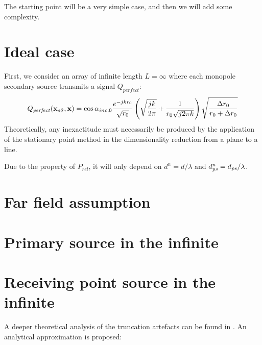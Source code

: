 The starting point will be a very simple case, and then we will add some complexity.

\section{Ideal case}
First, we consider an array of infinite length $L=\infty$ where each monopole secondary source transmits a signal $Q_\mathit{perfect}$:
\begin{equation}
Q_\mathit{perfect}(\PosTheo[section], \PosTheo) = \cos\normPrimaryPropAngleSection \frac{e^{-jk\distLinePrimSource}}{\sqrt{\distLinePrimSource}} \left(\sqrt{\frac{j k}{2\pi}} + \frac{1}{\distLinePrimSource \sqrt{j 2 \pi k}}\right) \sqrt{\frac{\distLinePoint}{\distLinePrimSource + \distLinePoint}}
\end{equation}
Theoretically, any inexactitude must necessarily be produced by the application of the stationary point method in the dimensionality reduction from a plane to a line.

Due to the property of $P_{rel}$, it will only depend on $d^{n} = d/\lambda$ and $d_{\PosTheoSubInd[primarySource]}^{n} = d_{\PosTheoSubInd[primarySource]}/\lambda$.



\section{Far field assumption}


\section{Primary source in the infinite}

\section{Receiving point source in the infinite}



A deeper theoretical analysis of the truncation artefacts can be found in \cite[Section 4.3]{Start1997}. An analytical approximation is proposed:


